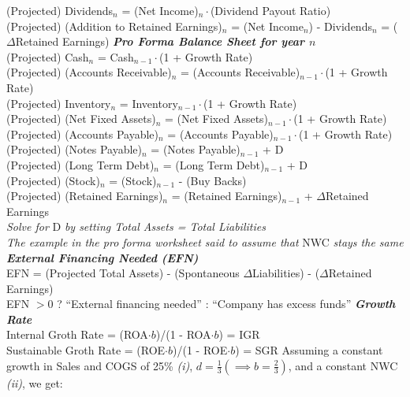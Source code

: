 \documentclass{letter}
\newcommand{\textib}[1]{\textit{\textbf{{#1}}}}
\begin{document}
(Projected) Dividends$_n$ = (Net Income)$_n \cdot$(Dividend Payout Ratio) \\
(Projected) (Addition to Retained Earnings)$_n$ = (Net Income$_n$) - Dividends$_n$ = ($\Delta$Retained Earnings)
\newline
\textib{Pro Forma Balance Sheet for year $n$} \\
(Projected) Cash$_n$ = Cash$_{n - 1} \cdot$(1 + Growth Rate) \\
(Projected) (Accounts Receivable)$_n$ = (Accounts Receivable)$_{n - 1} \cdot$(1 + Growth Rate) \\
(Projected) Inventory$_n$ = Inventory$_{n - 1} \cdot$(1 + Growth Rate) \\
(Projected) (Net Fixed Assets)$_n$ = (Net Fixed Assets)$_{n - 1} \cdot$(1 + Growth Rate) \\
(Projected) (Accounts Payable)$_n$ = (Accounts Payable)$_{n - 1} \cdot$(1 + Growth Rate) \\
(Projected) (Notes Payable)$_n$ = (Notes Payable)$_{n - 1}$ + D \\
(Projected) (Long Term Debt)$_n$ = (Long Term Debt)$_{n - 1}$ + D \\
(Projected) (Stock)$_n$ = (Stock)$_{n - 1}$ - (Buy Backs) \\
(Projected) (Retained Earnings)$_n$ = (Retained Earnings)$_{n - 1}$ + $\Delta$Retained Earnings \\
\textit{Solve for} D \textit{by setting Total Assets = Total Liabilities} \\
\textit{The example in the pro forma worksheet said to assume that} NWC \textit{stays the same}
\newline
\textib{External Financing Needed (EFN)} \\
EFN = (Projected Total Assets) - (Spontaneous $\Delta$Liabilities) - ($\Delta$Retained Earnings) \\
EFN $> 0$ ? ``External financing needed'' : ``Company has excess funds''
\newline
\textib{Growth Rate} \\
Internal Groth Rate = (ROA$\cdot b$)/(1 - ROA$\cdot b$) = IGR \\
Sustainable Groth Rate = (ROE$\cdot b$)/(1 - ROE$\cdot b$) = SGR
\newline
Assuming a constant growth in Sales and COGS of 25\% \textit{(i)}, 
$d = \frac{1}{3} (\implies b = \frac{2}{3})$, 
and a constant NWC \textit{(ii)}, we get:
\newline
\end{document}
